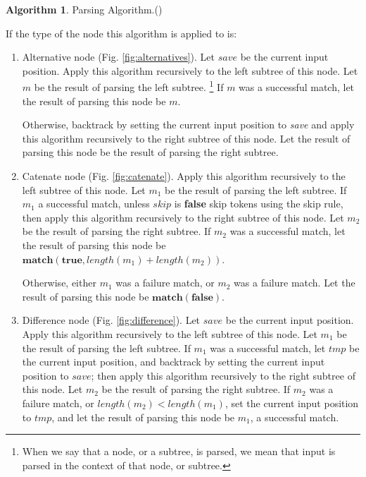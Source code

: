 \documentclass[a4paper,oneside,11pt]{book}
\theoremstyle{definition}
\newtheorem{algo}{Algorithm}[section]
\begin{document}
\begin{algo} Parsing Algorithm.\label{al:parsing} (\cite{SPIRIT})

\begin{flushleft}
If the type of the node this algorithm is applied to is:
\begin{enumerate}

\item
Alternative node (Fig. \ref{fig:alternatives}).
Let $save$ be the current input position. Apply this algorithm recursively to the left subtree of this node.
Let $m$ be the result of parsing the left subtree.
\footnote{When we say that a node, or a subtree, is parsed, we mean that input is parsed in the context of that node, or subtree.}
If $m$ was a successful match, let the result of parsing this node be $m$.

Otherwise, backtrack by setting the current input position to \emph{save} and
apply this algorithm recursively to the right subtree of this node.
Let the result of parsing this node be the result of parsing the right subtree.

\item
Catenate node (Fig. \ref{fig:catenate}). Apply this algorithm recursively to the left subtree of this node.
Let $m_1$ be the result of parsing the left subtree.
If $m_1$ a successful match, unless $skip$ is \textbf{false} skip tokens using the skip rule,
then apply this algorithm recursively to the right subtree of this node.
Let $m_2$ be the result of parsing the right subtree.
If $m_2$ was a successful match, let the result of parsing this node be $\textbf{match}(\textbf{true}, length(m_1) + length(m_2))$.

Otherwise, either $m_1$ was a failure match, or $m_2$ was a failure match. Let the result of parsing this node be $\textbf{match}(\textbf{false})$.

\item
Difference node (Fig. \ref{fig:difference}).
Let $save$ be the current input position. Apply this algorithm recursively to the left subtree of this node.
Let $m_1$ be the result of parsing the left subtree.
If $m_1$ was a successful match, let $tmp$ be the current input position, and backtrack by setting the current input position to $save$;
then apply this algorithm recursively to the right subtree of this node. Let $m_2$ be the result of parsing the right subtree.
If $m_2$ was a failure match, or $length(m_2) < length(m_1)$, set the current input position to $tmp$,
and let the result of parsing this node be $m_1$, a successful match.


\end{enumerate}
\end{flushleft}
\end{algo}
\end{document}
